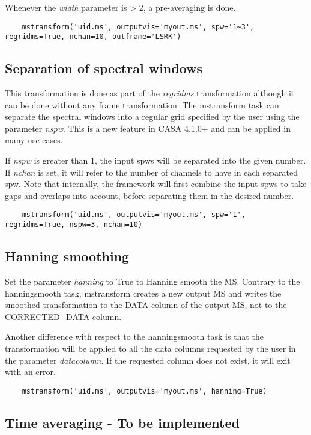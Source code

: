 Whenever the {\it width} parameter is > 2, a pre-averaging is done. 

\begin{verbatim}
    mstransform('uid.ms', outputvis='myout.ms', spw='1~3', regridms=True, nchan=10, outframe='LSRK')
\end{verbatim}

\subsection{Separation of spectral windows}
This transformation is done as part of the {\it regridms} transformation
although it can be done without any frame transformation. The mstransform
task can separate the spectral windows into a regular grid specified by the
user using the parameter {\it nspw}. This is a new feature in CASA
4.1.0+ and can be applied in many use-cases. %

If {\it nspw} is greater than 1, the input spws will be separated into the given
number. If {\it nchan} is set, it will refer to the number of channels to have in each
separated spw. Note that internally, the framework will first combine the input
spws to take gaps and overlaps into account, before separating them in the desired
number.

\begin{verbatim}
    mstransform('uid.ms', outputvis='myout.ms', spw='1', regridms=True, nspw=3, nchan=10)
\end{verbatim}

\subsection{Hanning smoothing}
Set the parameter {\it hanning} to True to Hanning smooth the MS. Contrary to the
hanningsmooth task, mstransform creates a new output MS and writes the smoothed transformation
to the DATA column of the output MS, not to the CORRECTED_DATA column.

Another difference with respect to the hanningsmooth task is that the transformation will be 
applied to all the data columns requested by the user in the parameter {\it datacolumn}. If the 
requested column does not exist, it will exit with an error. 

\begin{verbatim}
    mstransform('uid.ms', outputvis='myout.ms', hanning=True)
\end{verbatim}

\subsection{Time averaging - To be implemented}

